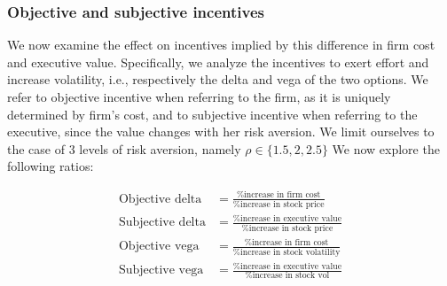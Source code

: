 











\subsubsection{Objective and subjective incentives}
We now examine the effect on incentives implied by this difference in firm cost and executive value. Specifically, we analyze the incentives to exert effort and increase volatility, i.e., respectively the delta and vega of the two options. We refer to objective incentive when referring to the firm, as it is uniquely determined by firm's cost, and to subjective incentive when referring to the executive, since the value changes with her risk aversion. We limit ourselves to the case of 3 levels of risk aversion, namely $\rho \in \{1.5, 2, 2.5\}$ We now explore the following ratios: 

\vspace{-2em}

\begin{align*}
\text{Objective delta} &= \frac{\text{\% increase in firm cost}}{\text{\% increase in stock price}} \\[1em]
\text{Subjective delta} &= \frac{\text{\% increase in executive value}}{\text{\% increase in stock price}} \\[1em]
\text{Objective vega} &= \frac{\text{\% increase in firm cost}}{\text{\% increase in stock volatility}} \\[1em]
\text{Subjective vega} &= \frac{\text{\% increase in executive value}}{\text{\% increase in stock vol}}
\end{align*}

